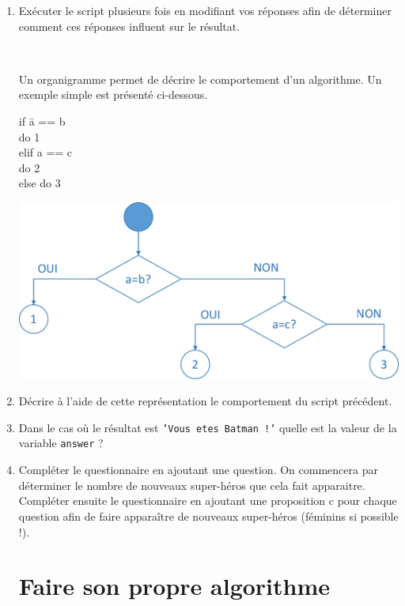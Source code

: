 \begin{exercice}

\begin{enumerate}
\item Exécuter le script plusieurs fois en modifiant vos réponses afin de déterminer comment ces réponses influent sur le résultat.

~\

Un organigramme permet de décrire le comportement d'un algorithme. Un exemple simple est présenté ci-dessous.

\begin{minipage}{.2\linewidth}
\ttfamily

\begin{tabbing}
if \= a == b \\
\> do 1 \\
elif a == c \\
\> do 2 \\
else do 3
\end{tabbing}

\rmfamily

\end{minipage}\hfill
\begin{minipage}{.7\linewidth}
\includegraphics[width=0.6\linewidth]{img/Organigramme}
\end{minipage}
\item Décrire à l'aide de cette représentation le comportement du script précédent.
\item Dans le cas où le résultat est \texttt{'Vous etes Batman !'} quelle est la valeur de la variable \texttt{answer} ?
\item Compléter le questionnaire en ajoutant une question. On commencera par déterminer le nombre de nouveaux super-héros que cela fait apparaitre. \\
Compléter ensuite le questionnaire en ajoutant une proposition \og c \fg pour chaque question afin de faire apparaître de nouveaux super-héros (féminins si possible !).


\section{Faire son propre algorithme}


\end{enumerate}
\end{exercice}
